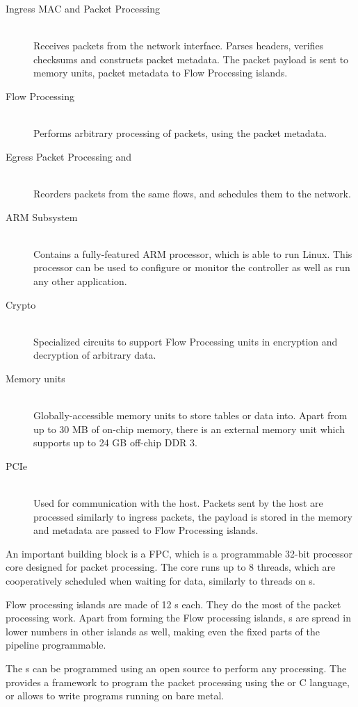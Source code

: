 \begin{description}
	\item[Ingress MAC and Packet Processing] \hfill \\
		Receives packets from the network interface. Parses headers, verifies
		checksums and constructs packet metadata. The packet payload is sent to
		memory units, packet metadata to Flow Processing islands.
	\item[Flow Processing] \hfill \\
		Performs arbitrary processing of packets, using the packet metadata.
	\item[Egress Packet Processing and ] \hfill \\
		Reorders packets from the same flows, and schedules them to the network.
	\item[ARM Subsystem] \hfill \\
		Contains a fully-featured ARM processor, which is able to run Linux.
		This processor can be used to configure or monitor the controller as
		well as run any other application.
	\item[Crypto] \hfill \\
		Specialized circuits to support Flow Processing units in encryption and
		decryption of arbitrary data.
	\item[Memory units] \hfill \\
		Globally-accessible memory units to store tables or data into. Apart
		from up to 30 MB of on-chip memory, there is an external memory unit which
		supports up to 24 GB off-chip DDR 3.
	\item[PCIe] \hfill \\
		Used for communication with the host. Packets sent by the host are
		processed similarly to ingress packets, the payload is stored in the
		memory and metadata are passed to Flow Processing islands.
\end{description}

An important building block is a \acrfull{FPC}, which is a programmable 32-bit
processor core designed for packet processing. The core runs up to 8 threads,
which are cooperatively scheduled when waiting for data, similarly to threads
on s.

Flow processing islands are made of 12 s each. They do the most of the
packet processing work. Apart from forming the Flow processing islands,
s are spread in lower numbers in other islands as well, making even the
fixed parts of the pipeline programmable.

The s can be programmed using an open source  to perform any
processing. The  provides a framework to program the packet processing
using the  or C language, or allows to write programs running on bare
metal.

